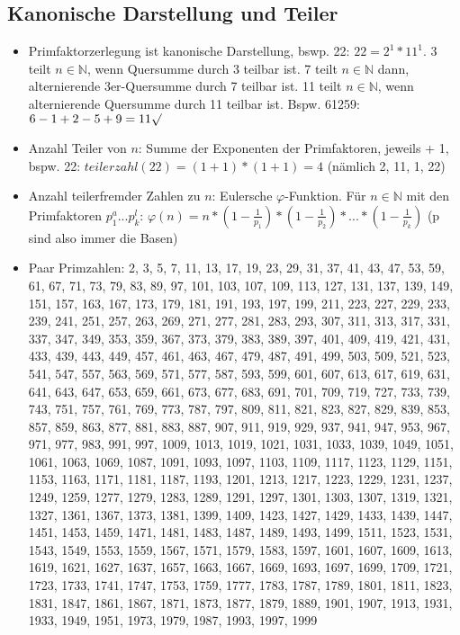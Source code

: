 \documentclass[12pt,landscape]{article}
\begin{document}
\begin{multicols}{3}
\subsection{Kanonische Darstellung und Teiler}
\begin{itemize}
	\item Primfaktorzerlegung ist kanonische Darstellung, bswp. 22: $22 = 2^1 * 11^1$. 3 teilt $n \in \mathbb{N}$, wenn Quersumme durch 3 teilbar ist. 7 teilt $n \in \mathbb{N}$ dann, alternierende 3er-Quersumme durch 7 teilbar ist. 11 teilt $n \in \mathbb{N}$, wenn alternierende Quersumme durch 11 teilbar ist. Bspw. 61259: $6 - 1 + 2 - 5 + 9 = 11 \surd$
	\item Anzahl Teiler von $n$: Summe der Exponenten der Primfaktoren, jeweils + 1, bspw. 22: $teilerzahl(22) = (1+1)*(1+1) = 4$ (nämlich 2, 11, 1, 22)
	\item Anzahl teilerfremder Zahlen zu $n$: Eulersche $\varphi$-Funktion. Für $n \in \mathbb{N}$ mit den Primfaktoren $p_1^a ... p_k^l$: $\varphi(n)=n*(1-\frac{1}{p_1})*(1-\frac{1}{p_2})*...*(1-\frac{1}{p_k})$ (p sind also immer die Basen)
	\item Paar Primzahlen: 2, 3, 5, 7, 11, 13, 17, 19, 23, 29, 31, 37, 41, 43, 47, 53, 59, 61, 67, 71, 73, 79, 83, 89, 97, 101, 103, 107, 109, 113, 127, 131, 137, 139, 149, 151, 157, 163, 167, 173, 179, 181, 191, 193, 197, 199, 211, 223, 227, 229, 233, 239, 241, 251, 257, 263, 269, 271, 277, 281, 283, 293, 307, 311, 313, 317, 331, 337, 347, 349, 353, 359, 367, 373, 379, 383, 389, 397, 401, 409, 419, 421, 431, 433, 439, 443, 449, 457, 461, 463, 467, 479, 487, 491, 499, 503, 509, 521, 523, 541, 547, 557, 563, 569, 571, 577, 587, 593, 599, 601, 607, 613, 617, 619, 631, 641, 643, 647, 653, 659, 661, 673, 677, 683, 691, 701, 709, 719, 727, 733, 739, 743, 751, 757, 761, 769, 773, 787, 797, 809, 811, 821, 823, 827, 829, 839, 853, 857, 859, 863, 877, 881, 883, 887, 907, 911, 919, 929, 937, 941, 947, 953, 967, 971, 977, 983, 991, 997, 1009, 1013, 1019, 1021, 1031, 1033, 1039, 1049, 1051, 1061, 1063, 1069, 1087, 1091, 1093, 1097, 1103, 1109, 1117, 1123, 1129, 1151, 1153, 1163, 1171, 1181, 1187, 1193, 1201, 1213, 1217, 1223, 1229, 1231, 1237, 1249, 1259, 1277, 1279, 1283, 1289, 1291, 1297, 1301, 1303, 1307, 1319, 1321, 1327, 1361, 1367, 1373, 1381, 1399, 1409, 1423, 1427, 1429, 1433, 1439, 1447, 1451, 1453, 1459, 1471, 1481, 1483, 1487, 1489, 1493, 1499, 1511, 1523, 1531, 1543, 1549, 1553, 1559, 1567, 1571, 1579, 1583, 1597, 1601, 1607, 1609, 1613, 1619, 1621, 1627, 1637, 1657, 1663, 1667, 1669, 1693, 1697, 1699, 1709, 1721, 1723, 1733, 1741, 1747, 1753, 1759, 1777, 1783, 1787, 1789, 1801, 1811, 1823, 1831, 1847, 1861, 1867, 1871, 1873, 1877, 1879, 1889, 1901, 1907, 1913, 1931, 1933, 1949, 1951, 1973, 1979, 1987, 1993, 1997, 1999

\end{itemize}
\end{multicols}
\end{document}
